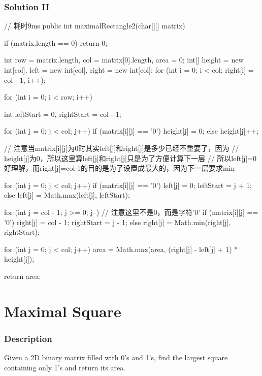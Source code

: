 \subsubsection{Solution II}
\begin{Code}
// 耗时9ms
public int maximalRectangle2(char[][] matrix) {
    if (matrix.length == 0) {
        return 0;
    }

    int row = matrix.length, col = matrix[0].length, area = 0;
    int[] height = new int[col], left = new int[col], right = new int[col];
    for (int i = 0; i < col; right[i] = col - 1, i++);

    for (int i = 0; i < row; i++) {
        int leftStart = 0, rightStart = col - 1;

        for (int j = 0; j < col; j++) {
            if (matrix[i][j] == '0') {
                height[j] = 0;
            } else {
                height[j]++;
            }
        }

        // 注意当matrix[i][j]为0时其实left[j]和right[j]是多少已经不重要了，因为
        // height[j]为0，所以这里算left[j]和right[j]只是为了方便计算下一层
        // 所以left[j]=0好理解，而right[j]=col-1的目的是为了设置成最大的，因为下一层要求min

        for (int j = 0; j < col; j++) {
            if (matrix[i][j] == '0') {
                left[j] = 0;
                leftStart = j + 1;
            } else {
                left[j] = Math.max(left[j], leftStart);
            }
        }

        for (int j = col - 1; j >= 0; j--) {
            // 注意这里不是0，而是字符'0'
            if (matrix[i][j] == '0') {
                right[j] = col - 1;
                rightStart = j - 1;
            } else {
                right[j] = Math.min(right[j], rightStart);
            }
        }

        for (int j = 0; j < col; j++) {
            area = Math.max(area, (right[j] - left[j] + 1) * height[j]);
        }
    }

    return area;
}
\end{Code}

\newpage

\section{Maximal Square} %

\subsubsection{Description}
Given a 2D binary matrix filled with 0's and 1's, find the largest square containing only 1's and return its area.

